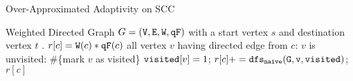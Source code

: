     \begin{algorithm}
        \caption{
        {Over-Approximated Adaptivity on SCC}
        \label{alg:overadp_alg}
        }
        \begin{algorithmic}
        \REQUIRE Weighted Directed Graph $G = (\mathtt{V}, \mathtt{E}, \mathtt{W}, \mathtt{qF})$ with a start vertex $s$ and destination vertex $t$ .
        \STATE $r[c] = \mathtt{W}(c)*\mathtt{qF}(c) $
          all vertex $v$ having directed edge from $c$:
        \STATE {}  $v$ is unvisited:
        \STATE \qquad \qquad  \#\{mark $v$ as visited\} $\mathtt{visited}[v] = 1$;
        \STATE \qquad \qquad $r[c] += \mathtt{dfs_{naive}(G, v, visited)}$;
        \RETURN $r[c]$
        \end{algorithmic}
        \end{algorithm}%
